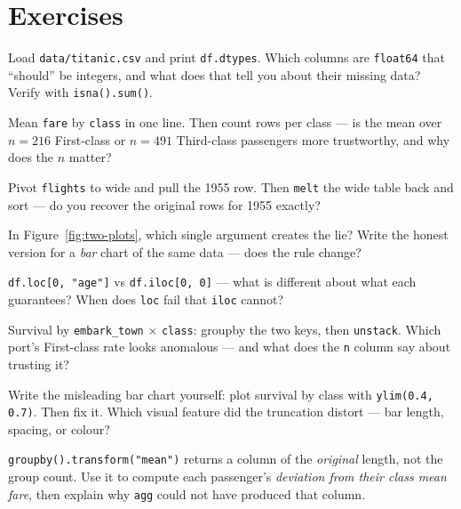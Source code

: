 \section*{Exercises}

\begin{exercise}[easy]
Load \texttt{data/titanic.csv} and print \texttt{df.dtypes}. Which columns
are \texttt{float64} that ``should'' be integers, and what does that tell
you about their missing data? Verify with \texttt{isna().sum()}.
\end{exercise}
\begin{exercise}[easy]
Mean \texttt{fare} by \texttt{class} in one line. Then count rows per class
--- is the mean over $n{=}216$ First-class or $n{=}491$ Third-class
passengers more trustworthy, and why does the $n$ matter?
\end{exercise}
\begin{exercise}[easy]
Pivot \texttt{flights} to wide and pull the 1955 row. Then \texttt{melt}
the wide table back and sort --- do you recover the original rows for
1955 exactly?
\end{exercise}
\begin{exercise}[easy]
In Figure~\ref{fig:two-plots}, which single argument creates the lie?
Write the honest version for a \emph{bar} chart of the same data --- does
the rule change?
\end{exercise}
\begin{exercise}[easy]
\texttt{df.loc[0, "age"]} vs \texttt{df.iloc[0, 0]} --- what is different
about what each guarantees? When does \texttt{loc} fail that
\texttt{iloc} cannot?
\end{exercise}
\begin{exercise}[medium]
Survival by \texttt{embark\_town} $\times$ \texttt{class}: groupby the two
keys, then \texttt{unstack}. Which port's First-class rate looks anomalous
--- and what does the \texttt{n} column say about trusting it?
\end{exercise}
\begin{exercise}[medium]
Write the misleading bar chart yourself: plot survival by class with
\texttt{ylim(0.4, 0.7)}. Then fix it. Which visual feature did the
truncation distort --- bar length, spacing, or colour?
\end{exercise}
\begin{exercise}[medium]
\texttt{groupby().transform("mean")} returns a column of the
\emph{original} length, not the group count. Use it to compute each
passenger's \emph{deviation from their class mean fare}, then explain why
\texttt{agg} could not have produced that column.
\end{exercise}
